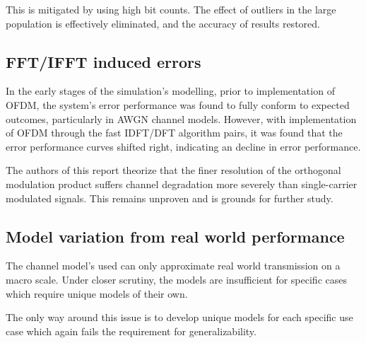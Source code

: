 This is mitigated by using high bit counts. The effect of outliers in the large population is effectively eliminated, and the accuracy of results restored.

\subsection{FFT/IFFT induced errors}
In the early stages of the simulation's modelling, prior to implementation of \gls{OFDM}, the system's error performance was found to fully conform to expected outcomes, particularly in AWGN channel models. However, with implementation of OFDM through the fast IDFT/DFT algorithm pairs, it was found that the error performance curves shifted right, indicating an decline in error performance.

The authors of this report theorize that the finer resolution of the orthogonal modulation product suffers channel degradation more severely than single-carrier modulated signals. This remains unproven and is grounds for further study.

\subsection{Model variation from real world performance}
The channel model's used can only approximate real world transmission on a macro scale. Under closer scrutiny, the models are insufficient for specific cases which require unique models of their own.

The only way around this issue is to develop unique models for each specific use case which again fails the requirement for generalizability.

